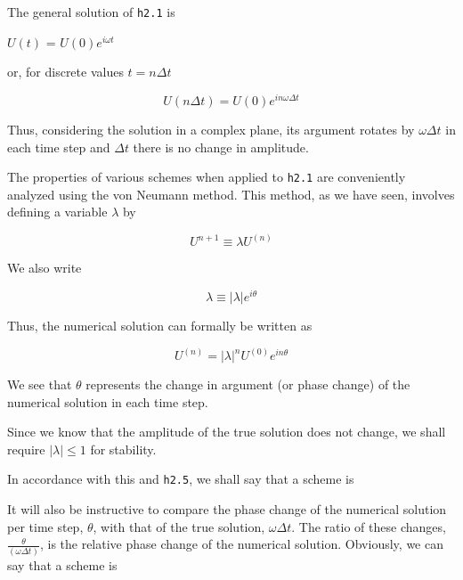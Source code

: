 The general solution of \texttt{h2.1} is

\(U\left( t \right)\) = \(U\left( 0 \right)e^{i \omega t}\)

or, for discrete values \(t = n\Delta t\)

\[U( n \Delta t ) = U( 0 )e^{i n \omega \Delta t}\]

Thus, considering the solution in a complex plane, its argument rotates
by \(\omega\Delta t\) in each time step and \(\Delta t\) there is no
change in amplitude.

The properties of various schemes when applied to \texttt{h2.1} are
conveniently analyzed using the von Neumann method. This method, as we
have seen, involves defining a variable \(\lambda\) by

\[U^{n + 1} \equiv \lambda U^{\left( n \right)}\]

We also write

\[\lambda \equiv | \lambda |e^{i\theta}\]

Thus, the numerical solution can formally be written as

\[U^{( n )} = | \lambda |^{n}U^{( 0 )}e^{i n \theta}\]

We see that \(\theta\) represents the change in argument (or phase
change) of the numerical solution in each time step.

Since we know that the amplitude of the true solution does not change,
we shall require \(| \lambda | \leq 1\) for stability.

In accordance with this and \texttt{h2.5}, we shall say that a scheme is


It will also be instructive to compare the phase change of the numerical
solution per time step, \(\theta\), with that of the true solution,
\(\omega\Delta t\). The ratio of these changes,
\(\frac{\theta}{(\omega \Delta t)}\), is the relative phase change of
the numerical solution. Obviously, we can say that a scheme is


